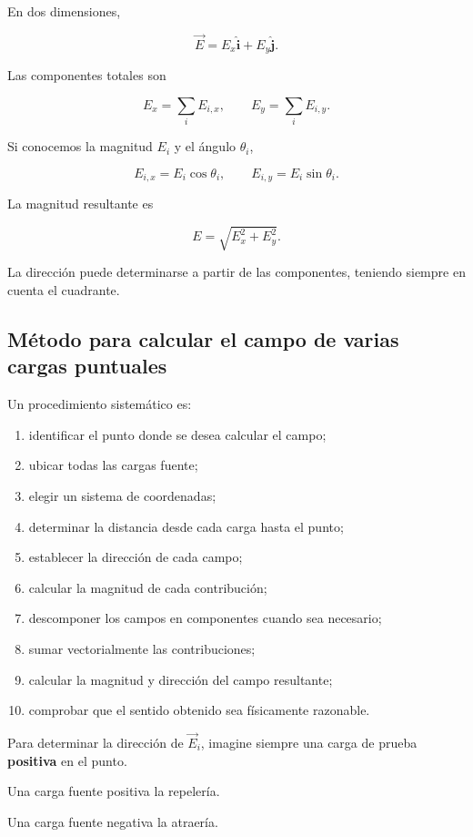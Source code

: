 En dos dimensiones,

\[
\vec E=E_x\hat{\mathbf i}+E_y\hat{\mathbf j}.
\]

Las componentes totales son

\[
\boxed{E_x=\sum_iE_{i,x}},
\qquad
\boxed{E_y=\sum_iE_{i,y}}.
\]

Si conocemos la magnitud \(E_i\) y el ángulo \(\theta_i\),

\[
E_{i,x}=E_i\cos\theta_i,
\qquad
E_{i,y}=E_i\sin\theta_i.
\]

La magnitud resultante es

\[
\boxed{E=\sqrt{E_x^2+E_y^2}}.
\]

La dirección puede determinarse a partir de las componentes, teniendo siempre en
cuenta el cuadrante.


\subsection{Método para calcular el campo de varias cargas puntuales}

Un procedimiento sistemático es:

\begin{enumerate}
    \item identificar el punto donde se desea calcular el campo;
    \item ubicar todas las cargas fuente;
    \item elegir un sistema de coordenadas;
    \item determinar la distancia desde cada carga hasta el punto;
    \item establecer la dirección de cada campo;
    \item calcular la magnitud de cada contribución;
    \item descomponer los campos en componentes cuando sea necesario;
    \item sumar vectorialmente las contribuciones;
    \item calcular la magnitud y dirección del campo resultante;
    \item comprobar que el sentido obtenido sea físicamente razonable.
\end{enumerate}

\begin{idea}

Para determinar la dirección de \(\vec E_i\), imagine siempre una carga de prueba
\textbf{positiva} en el punto.

Una carga fuente positiva la repelería.

Una carga fuente negativa la atraería.

\end{idea}


